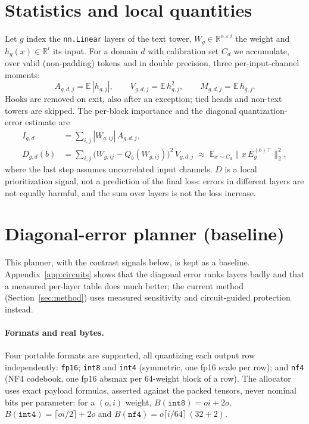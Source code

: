 \documentclass[11pt]{article}
\newcommand{\E}{\mathbb{E}}
\newcommand{\code}[1]{\texttt{#1}}
\begin{document}
\section{Statistics and local quantities}
\label{sec:stats}

Let $g$ index the \code{nn.Linear} layers of the text tower, $W_g\in\mathbb{R}^{o\times i}$ the weight
and $h_g(x)\in\mathbb{R}^{i}$ its input. For a domain $d$ with calibration set $C_d$ we accumulate, over
valid (non-padding) tokens and in double precision, three per-input-channel moments:
\begin{equation}
A_{g,d,j}=\E\,|h_{g,j}|,\qquad V_{g,d,j}=\E\,h_{g,j}^2,\qquad M_{g,d,j}=\E\,h_{g,j}.
\end{equation}
Hooks are removed on exit, also after an exception; tied heads and non-text towers are skipped.
The per-block importance and the diagonal quantization-error estimate are
\begin{align}
I_{g,d} &= \sum_{i,j} |W_{g,ij}|\,A_{g,d,j},\\
D_{g,d}(b) &= \sum_{i,j}\bigl(W_{g,ij}-Q_b(W_{g,ij})\bigr)^2\,V_{g,d,j}\;\approx\;\E_{x\sim C_d}\bigl\|x\,E_g^{(b)\top}\bigr\|_2^2 ,
\end{align}
where the last step assumes uncorrelated input channels. $D$ is a local prioritization signal, not a prediction of
the final loss: errors in different layers are not equally harmful, and the sum over layers is not the
loss increase.

\section{Diagonal-error planner (baseline)}
\label{sec:planner}

This planner, with the contrast signals below, is kept as a baseline. Appendix~\ref{app:circuits} shows that the diagonal error ranks layers badly and that a measured per-layer table does much better;
the current method (Section~\ref{sec:method}) uses measured sensitivity and circuit-guided protection instead.

\paragraph{Formats and real bytes.}
Four portable formats are supported, all quantizing each output row independently:
\code{fp16}; \code{int8} and \code{int4} (symmetric, one fp16 scale per row); and \code{nf4}
(NF4 codebook, one fp16 absmax per 64-weight block of a row). The allocator uses exact payload formulas,
asserted against the packed tensors, never nominal bits per parameter: for a $(o,i)$ weight,
$B(\code{int8})=oi+2o$, $B(\code{int4})=\lceil oi/2\rceil+2o$ and $B(\code{nf4})=o\lceil i/64\rceil\,(32+2)$.
\end{document}
